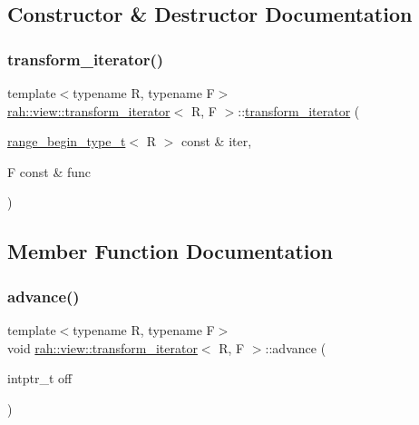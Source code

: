 \subsection{Constructor \& Destructor Documentation}
\mbox{\label{structrah_1_1view_1_1transform__iterator_ae8f127be961b14896c87d94e710a9a1a}} 
\subsubsection{\texorpdfstring{transform\_iterator()}{transform\_iterator()}}
{\footnotesize\ttfamily template$<$typename R, typename F$>$ \\
\mbox{\hyperlink{structrah_1_1view_1_1transform__iterator}{rah\+::view\+::transform\+\_\+iterator}}$<$ R, F $>$\+::\mbox{\hyperlink{structrah_1_1view_1_1transform__iterator}{transform\+\_\+iterator}} (\begin{DoxyParamCaption}\item[{\mbox{\hyperlink{namespacerah_a28aff4eeddcece6be65ff0b956d32d4a}{range\+\_\+begin\+\_\+type\+\_\+t}}$<$ R $>$ const \&}]{iter,  }\item[{F const \&}]{func }\end{DoxyParamCaption})\hspace{0.3cm}{\ttfamily [inline]}}



\subsection{Member Function Documentation}
\mbox{\label{structrah_1_1view_1_1transform__iterator_a56c602664659b11bfca3da418c6977be}} 
\subsubsection{\texorpdfstring{advance()}{advance()}}
{\footnotesize\ttfamily template$<$typename R, typename F$>$ \\
void \mbox{\hyperlink{structrah_1_1view_1_1transform__iterator}{rah\+::view\+::transform\+\_\+iterator}}$<$ R, F $>$\+::advance (\begin{DoxyParamCaption}\item[{intptr\+\_\+t}]{off }\end{DoxyParamCaption})\hspace{0.3cm}{\ttfamily [inline]}}

